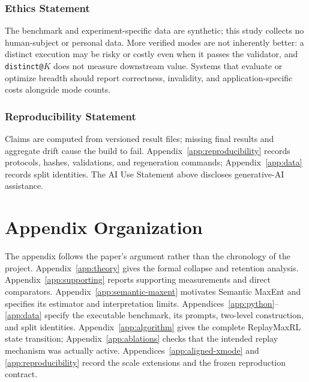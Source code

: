 \documentclass{article}
\newcommand{\1}{\mathbf 1}
\theoremstyle{remark}
\theoremstyle{definition}
\theoremstyle{plain}
\begin{document}
\subsubsection*{Ethics Statement}

The benchmark and experiment-specific data are synthetic; this study collects
no human-subject or personal data. More verified modes are not inherently
better: a distinct execution may be risky or costly even when it passes the
validator, and \texttt{distinct@}$K$ does not measure downstream value. Systems
that evaluate or optimize breadth should report correctness, invalidity, and
application-specific costs alongside mode counts.

\subsubsection*{Reproducibility Statement}

Claims are computed from versioned result files; missing final results and aggregate drift cause the build to
fail. Appendix~\ref{app:reproducibility} records protocols, hashes, validations,
and regeneration commands; Appendix~\ref{app:data} records split identities.
The AI Use Statement above discloses generative-AI assistance.




\section*{Appendix Organization}
\label{app:organization}

The appendix follows the paper's argument rather than the chronology of the
project. Appendix~\ref{app:theory} gives the formal collapse and retention
analysis. Appendix~\ref{app:supporting} reports supporting measurements and
direct comparators. Appendix~\ref{app:semantic-maxent} motivates Semantic MaxEnt
and specifies its estimator and interpretation limits.
Appendices~\ref{app:python}--\ref{app:data} specify the executable benchmark,
its prompts, two-level construction, and split identities.
Appendix~\ref{app:algorithm} gives the complete ReplayMaxRL state transition;
Appendix~\ref{app:ablations} checks that the intended replay mechanism was
actually active. Appendices~\ref{app:aligned-xmode} and
\ref{app:reproducibility} record the scale extensions and the frozen
reproduction contract.

\appendix
\onecolumn
\raggedbottom
\end{document}
